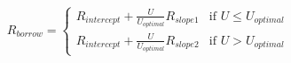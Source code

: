 \documentclass[preview]{standalone}
\begin{document}
\begin{align*}
R_{borrow} = \begin{cases} R_{intercept} + \frac{U}{U_{optimal}}R_{slope1} & \text{if } U \leq U_{optimal} \\ R_{intercept} + \frac{U}{U_{optimal}}R_{slope2} & \text{if } U > U_{optimal} \end{cases}
\end{align*}
\end{document}
